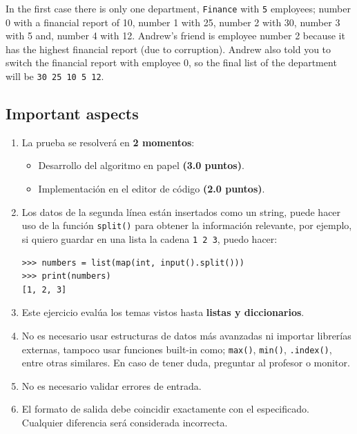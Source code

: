 \documentclass[11pt,a4paper]{article}
\begin{document}
In the first case there is only one department, \texttt{Finance} with \texttt{5} employees; number 0 with a financial report of 10, number 1 with 25, number 2 with 30, number 3 with 5 and, number 4 with 12. Andrew's friend is employee number 2 because it has the highest financial report (due to corruption). Andrew also told you to switch the financial report with employee 0, so the final list of the department will be \texttt{30 25 10 5 12}.

\subsection*{Important aspects}

\begin{enumerate}
  \item La prueba se resolverá en \textbf{2 momentos}:
        \begin{itemize}
            \item Desarrollo del algoritmo en papel \textbf{(3.0 puntos)}.
            \item Implementación en el editor de código \textbf{(2.0 puntos)}.
        \end{itemize}

  \item Los datos de la segunda línea están insertados como un string, puede hacer uso de la función \lstinline[style=pythonstyle]|split()| para obtener la información relevante, por ejemplo, si quiero guardar en una lista la cadena \texttt{1 2 3}, puedo hacer:
        \begin{lstlisting}[style=pythonstyle]
>>> numbers = list(map(int, input().split()))
>>> print(numbers)
[1, 2, 3]
        \end{lstlisting}

  \item Este ejercicio evalúa los temas vistos hasta \textbf{listas y diccionarios}.

  \item No es necesario usar estructuras de datos más avanzadas ni importar librerías externas, tampoco usar funciones built-in como; \lstinline[style=pythonstyle]|max()|, \lstinline[style=pythonstyle]|min()|, \lstinline[style=pythonstyle]|.index()|, entre otras similares. En caso de tener duda, preguntar al profesor o monitor.

  \item No es necesario validar errores de entrada.

  \item El formato de salida debe coincidir exactamente con el especificado. Cualquier diferencia será considerada incorrecta.
\end{enumerate}
\end{document}

